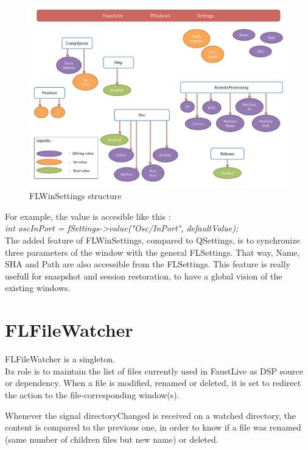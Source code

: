 \documentclass[a4paper]{article}
\begin{document}
{\begin{figure}[!h]
\begin{center}
\includegraphics[width=\columnwidth]{images/FLWinSettings}
\caption{FLWinSettings structure}
\label{fig:FLWinSettings}
\end{center}
\end{figure}


For example, the value is accesible like this :\\
\textit{int oscInPort = fSettings->value("Osc/InPort", defaultValue);} \\

The added feature of FLWinSettings, compared to QSettings, is to synchronize three parameters of the window with the general FLSettings. That way, Name, SHA and Path are also accessible from the FLSettings. This feature is really usefull for snaspshot and session restoration, to have a global vision of the existing windows.

\section{FLFileWatcher}

FLFileWatcher is a singleton. \\
Its role is to maintain the list of files currently used in FaustLive as DSP source or dependency. When a file is modified, renamed or deleted, it is set to redirect the action to the file-corresponding window(s).

Whenever the signal directoryChanged is received on a watched directory, the content is compared to the previous one, in order to know if a file was renamed (same number of children files but new name) or deleted. 

}
\end{document}
